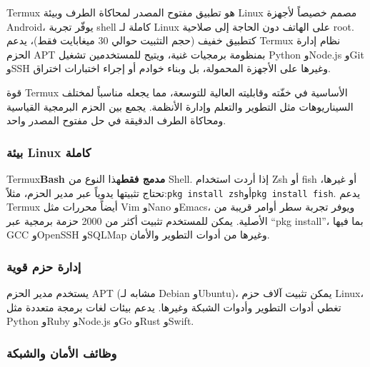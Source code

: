 


Termux هو تطبيق مفتوح المصدر لمحاكاة الطرف وبيئة Linux مصمم خصيصاً لأجهزة Android، يوفّر تجربة shell كاملة لـ Linux على الهاتف دون الحاجة إلى صلاحية root. كتطبيق خفيف (حجم التثبيت حوالي 30 ميغابايت فقط)، يدعم Termux نظام إدارة الحزم APT بمنظومة برمجيات غنية، ويتيح للمستخدمين تشغيل Python وNode.js وGit وSSH وغيرها على الأجهزة المحمولة، بل وبناء خوادم أو إجراء اختبارات اختراق.

قوة Termux الأساسية في خفّته وقابليته العالية للتوسعة، مما يجعله مناسباً لمختلف السيناريوهات مثل التطوير والتعلم وإدارة الأنظمة. يجمع بين الحزم البرمجية القياسية ومحاكاة الطرف الدقيقة في حل مفتوح المصدر واحد.


\subsubsection*{بيئة Linux كاملة}

Termux\textbf{Bash مدمج فقط}هذا النوع من Shell. إذا أردت استخدام Zsh أو fish أو غيرها، تحتاج تثبيتها يدوياً عبر مدير الحزم، مثلاً:\texttt{pkg install zsh}أو\texttt{pkg install fish}. يدعم Termux أيضاً محررات مثل Vim وNano وEmacs، ويوفر تجربة سطر أوامر قريبة من الأصلية. يمكن للمستخدم تثبيت أكثر من 2000 حزمة برمجية عبر “pkg install”، بما فيها GCC وOpenSSH وSQLMap وغيرها من أدوات التطوير والأمان.

\subsubsection*{إدارة حزم قوية}

يستخدم مدير الحزم APT (مشابه لـ Debian وUbuntu)، يمكن تثبيت آلاف حزم Linux، تغطي أدوات التطوير وأدوات الشبكة وغيرها. يدعم بيئات لغات برمجة متعددة مثل Python وRuby وNode.js وGo وRust وSwift.

\subsubsection*{وظائف الأمان والشبكة}

